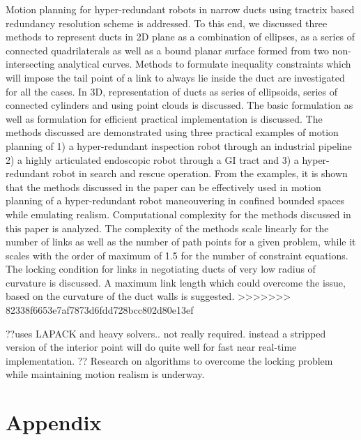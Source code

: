 \documentclass[12pt,a4]{article}
\begin{document}
Motion planning for hyper-redundant robots in narrow ducts using tractrix based redundancy resolution scheme is addressed. To this end, we discussed three methods to represent ducts in 2D plane as a combination of ellipses, as a series of connected quadrilaterals as well as a bound planar surface formed from two non-intersecting analytical curves. Methods to formulate inequality constraints which will impose the tail point of a link to always lie inside the duct are investigated for all the cases. In 3D, representation of ducts as series of ellipsoids, series of connected cylinders and using point clouds is discussed. The basic formulation as well as formulation for efficient practical implementation is discussed. The methods discussed are demonstrated using three practical examples of motion planning of 1) a hyper-redundant inspection robot through an industrial pipeline 2) a highly articulated endoscopic robot through a GI tract and 3) a hyper-redundant robot in search and rescue operation. From the examples, it is shown that the methods discussed in the paper can be effectively used in motion planning of a hyper-redundant robot maneouvering in confined bounded spaces while emulating realism. Computational complexity for the methods discussed in this paper is analyzed. The complexity of the methods scale linearly for the number of links as well as the number of path points for a given problem, while it scales with the order of maximum of 1.5 for the number of constraint equations. The locking condition for links in negotiating ducts of very low radius of curvature is discussed. A maximum link length which could overcome the issue, based on the curvature of the duct walls is suggested.
>>>>>>> 82338f6653e7af7873d6fdd728bcc802d80e13ef

??uses LAPACK and heavy solvers.. not really required. instead a stripped version of the interior point will do quite well for fast near real-time implementation. ?? Research on algorithms to overcome the locking problem while maintaining motion realism is underway.




\section{Appendix}	
\end{document}
